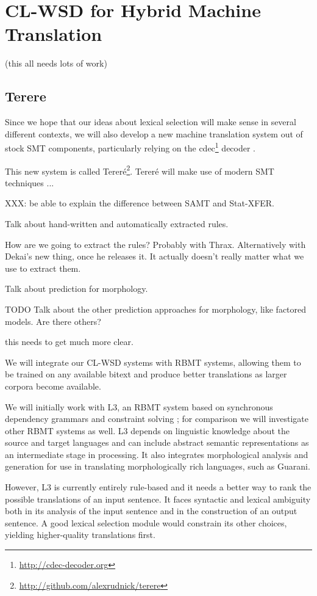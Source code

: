 \section{CL-WSD for Hybrid Machine Translation}

(this all needs lots of work)

\subsection{Terere}
Since we hope that our ideas about lexical selection will make sense in several
different contexts, we will also develop a new machine translation system out
of stock SMT components, particularly relying on the
cdec\footnote{\url{http://cdec-decoder.org}} decoder \cite{Dyer_etal_2010}.

This new system is called
Tereré\footnote{\url{http://github.com/alexrudnick/terere}}. Tereré will make
use of modern SMT techniques ...

XXX: be able to explain the difference between SAMT and Stat-XFER.

Talk about hand-written and automatically extracted rules.

How are we going to extract the rules? Probably with Thrax. Alternatively with
Dekai's new thing, once he releases it. It actually doesn't really matter what
we use to extract them.

Talk about prediction for morphology.
\cite{toutanova-suzuki-ruopp:2008:ACLMain}

TODO Talk about the other prediction approaches for morphology, like factored
models. Are there others?

this needs to get much more clear.

We will integrate our CL-WSD systems with RBMT systems, allowing them to be
trained on any available bitext and produce better translations as larger
corpora become available.

We will initially work with L3, an RBMT system based on synchronous dependency
grammars and constraint solving \cite{gasser:sxdg,gasser:aflat2012};
for comparison we will investigate other RBMT systems as well.
L3 depends on linguistic knowledge about the source and target languages and
can include abstract semantic representations as an intermediate stage in
processing. It also integrates morphological analysis and generation for use in
translating morphologically rich languages, such as Guarani.

However, L3 is currently entirely rule-based and it needs a better way to rank
the possible translations of an input sentence. It faces syntactic and lexical
ambiguity both in its analysis of the input sentence and in the construction of
an output sentence.  A good lexical selection module would constrain its other
choices, yielding higher-quality translations first.

